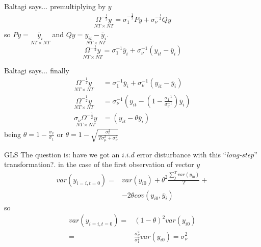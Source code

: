 \begin{frame}{Baltagi says...}
	premultiplying by $y$
		\begin{gather}
			\underset{NT\times NT}{\Omega ^{-\frac{1}{2}}y}=\sigma _{1}^{-\frac{1}{2}}Py+\sigma _{\nu }^{-\frac{1}{2}}Qy
		\end{gather}
	so $Py=\underset{NT\times NT}{\overline{y}_{i}}$ and $Qy=\underset{NT\times NT}{y_{it}-\overline{y}_{i}}.$%
		$$\underset{NT\times NT}{\Omega ^{-\frac{1}{2}}y}=\sigma _{1}^{-1}\overline{y}_{i}+\sigma _{\nu }^{-1}\left( y_{it}-\overline{y}_{i}\right)$$
\end{frame}
\begin{frame}{Baltagi says...}
	finally
		\begin{align*}
			\underset{NT\times NT}{\Omega ^{-\frac{1}{2}}y} & = \sigma _{1}^{-1}\overline{
																y}_{i}+\sigma _{\nu }^{-1}\left( y_{it}-\overline{y}_{i}\right) \\
			\underset{NT\times NT}{\Omega ^{-\frac{1}{2}}y} & = \sigma _{\nu
																}^{-1}(y_{it}-\left( 1-\frac{\sigma _{1}^{-1}}{\sigma _{\nu }^{-1}}\right) 
																\overline{y}_{i}) \\
			\underset{NT\times NT}{\sigma _{\nu }\Omega ^{-\frac{1}{2}}y} & = (y_{it}-\theta \overline{y}_{i})
		\end{align*}
	being $\theta =1-\frac{\sigma_{v}}{\sigma_{1}}$ or $\theta=1-\sqrt{\frac{\sigma_{v}^{2}}{T\sigma_{\mu}^{2}+\sigma_{\nu }^{2}}}$
\end{frame}
\begin{frame}{GLS}
	The question is: have we got an $i.i.d$ error disturbance with this ``\emph{long-step}'' transformation?. in the case of the first observation of vector $y$
		\begin{align*}
			var\left( y_{i=i,t=0}\right) = & var(y_{i0})+\theta ^{2}\frac{
											 \sum_{j}^{T}var(y_{i0})}{T}+ \\
										   & -2\theta cov\left( y_{i0},\overline{y}_{i}\right)
		\end{align*}
	so
		\begin{align*}
			var\left( y_{i=i,t=0}\right) = &\left( 1-\theta \right) ^{2}var(y_{i0}) \\
										 = & \frac{\sigma _{\nu }^{2}}{\sigma _{1}^{2}}var(y_{i0})=\sigma _{\nu }^{2}
		\end{align*}
\end{frame}
